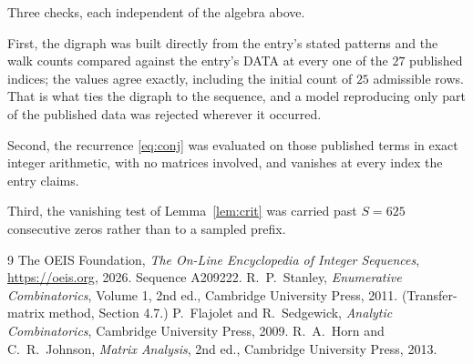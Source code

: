 \documentclass[11pt,a4paper]{article}
\theoremstyle{plain}
\theoremstyle{definition}
\begin{document}
Three checks, each independent of the algebra above.

First, the digraph was built directly from the entry's stated patterns and the walk counts
compared against the entry's DATA at every one of the $27$ published indices; the
values agree exactly, including the initial count of $25$ admissible rows. That is
what ties the digraph to the sequence, and a model reproducing only part of the published
data was rejected wherever it occurred.

Second, the recurrence \eqref{eq:conj} was evaluated on those published terms in exact
integer arithmetic, with no matrices involved, and vanishes at every index the entry claims.

Third, the vanishing test of Lemma~\ref{lem:crit} was carried past $S=625$ consecutive
zeros rather than to a sampled prefix.

\begin{thebibliography}{9}
 The OEIS Foundation, \emph{The On-Line Encyclopedia of Integer
Sequences}, \url{https://oeis.org}, 2026. Sequence A209222.
 R.~P.~Stanley, \emph{Enumerative Combinatorics}, Volume 1, 2nd ed.,
Cambridge University Press, 2011. (Transfer-matrix method, Section 4.7.)
 P.~Flajolet and R.~Sedgewick, \emph{Analytic Combinatorics}, Cambridge
University Press, 2009.
 R.~A.~Horn and C.~R.~Johnson, \emph{Matrix Analysis}, 2nd ed., Cambridge
University Press, 2013.
\end{thebibliography}
\end{document}
